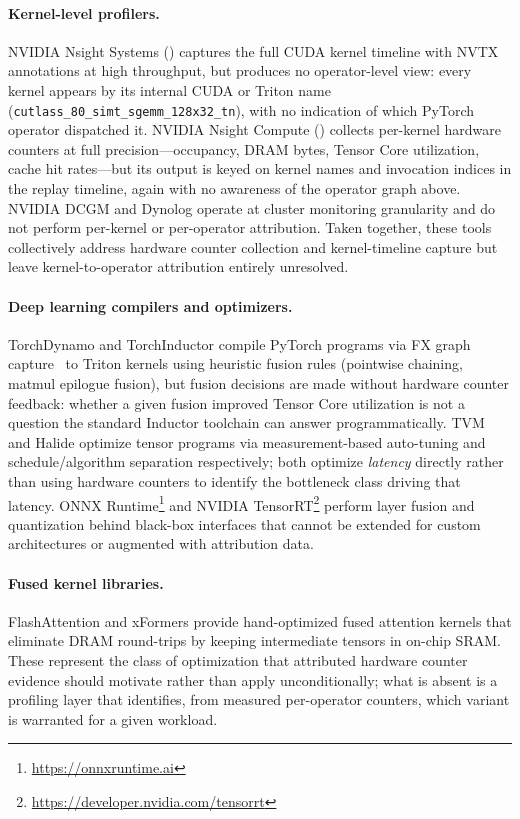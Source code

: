 \paragraph{Kernel-level profilers.}
NVIDIA Nsight Systems (\nsys) \cite{nsightsystems} captures the full CUDA kernel timeline with
NVTX annotations at high throughput, but produces no operator-level view: every kernel appears by
its internal CUDA or Triton name (\eg \texttt{cutlass\_80\_simt\_sgemm\_128x32\_tn}), with no
indication of which PyTorch operator dispatched it. NVIDIA Nsight Compute (\ncu)
\cite{nsightcompute} collects per-kernel hardware counters at full precision---occupancy, DRAM
bytes, Tensor Core utilization, cache hit rates---but its output is keyed on kernel names and
invocation indices in the replay timeline, again with no awareness of the operator graph above.
NVIDIA DCGM and Dynolog \cite{dynolog2023} operate at cluster monitoring granularity and do not
perform per-kernel or per-operator attribution. Taken together, these tools collectively address
hardware counter collection and kernel-timeline capture but leave kernel-to-operator attribution entirely unresolved.

\paragraph{Deep learning compilers and optimizers.}
TorchDynamo and TorchInductor \cite{pytorch2024} compile PyTorch programs via FX graph capture~\cite{torchfx2022} to Triton kernels
using heuristic fusion rules (pointwise chaining, matmul epilogue fusion), but fusion decisions
are made without hardware counter feedback: whether a given fusion improved Tensor Core
utilization is not a question the standard Inductor toolchain can answer programmatically. TVM \cite{tvm2018} and Halide \cite{halide2013} optimize tensor programs via
measurement-based auto-tuning and schedule/algorithm separation respectively; both optimize
\emph{latency} directly rather than using hardware counters to identify the bottleneck class
driving that latency. ONNX Runtime\footnote{\url{https://onnxruntime.ai}} and NVIDIA
TensorRT\footnote{\url{https://developer.nvidia.com/tensorrt}} perform layer fusion and
quantization behind black-box interfaces that cannot be extended for custom architectures or
augmented with attribution data.

\paragraph{Fused kernel libraries.}
FlashAttention \cite{flashattention2022,flashattention2024} and xFormers \cite{xformers2022}
provide hand-optimized fused attention kernels that eliminate DRAM round-trips by keeping
intermediate tensors in on-chip SRAM. These represent the class of optimization that
attributed hardware counter evidence should motivate rather than apply unconditionally; what
is absent is a profiling layer that identifies, from measured per-operator counters, which
variant is warranted for a given workload.

